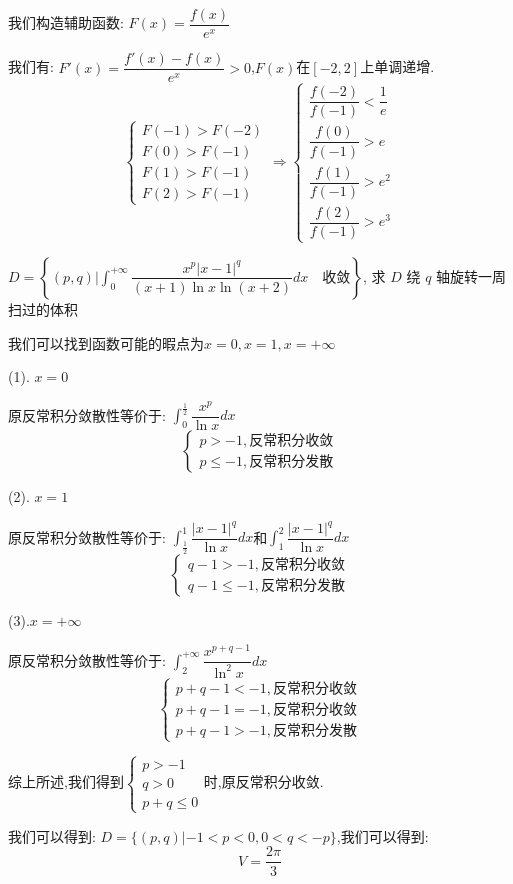 \begin{solution}

	我们构造辅助函数:  $F(x)=\dfrac{f(x)}{e^x}$
	
	我们有:  $F'(x)=\dfrac{f'(x)-f(x)}{e^x}>0$,$F(x)$在$[-2,2]$上单调递增.
	$$\left\lbrace
	\begin{array}{l}
		F(-1)>F(-2)\\
		F(0)>F(-1)\\
		F(1)>F(-1)\\
		F(2)>F(-1)
	\end{array}
	\right. \Rightarrow \left\lbrace
	\begin{array}{l}
		\dfrac{f(-2)}{f(-1)}<\dfrac{1}{e}\\
		\dfrac{f(0)}{f(-1)}>e\\
		\dfrac{f(1)}{f(-1)}>e^2\\
		\dfrac{f(2)}{f(-1)}>e^3
	\end{array}
	\right. $$
\end{solution}

\begin{example}[][Exam: 35.3.8]
	$D=\left\{(p,q)\big|\int_{0}^{+\infty}\dfrac{x^p|x-1|^q}{(x+1)\ln x\ln(x+2)}dx\quad \text{收敛}\right\}$, 求 $D$ 绕 $q$ 轴旋转一周扫过的体积
\end{example}
\begin{solution}

	我们可以找到函数可能的暇点为$x=0,x=1,x=+\infty$
	
	(1). $x=0$
	
	原反常积分敛散性等价于:  $\int_{0}^{\frac{1}{2}}\dfrac{x^p}{\ln x}dx$
	$$\left\lbrace
	\begin{array}{l}
		p>-1,\text{反常积分收敛}\\
		p\leq-1,\text{反常积分发散}
	\end{array}
	\right. $$
	
	(2). $x=1$
	
	原反常积分敛散性等价于:  $\int_{\frac{1}{2}}^{1}\dfrac{|x-1|^q}{\ln x}dx$和$\int_{1}^{2}\dfrac{|x-1|^q}{\ln x}dx$
	$$\left\lbrace
	\begin{array}{l}
		q-1>-1,\text{反常积分收敛}\\
		q-1\leq-1,\text{反常积分发散}
	\end{array}
	\right. $$
	
	(3).$x=+\infty$
	
	原反常积分敛散性等价于:  $\int_{2}^{+\infty}\dfrac{x^{p+q-1}}{\ln^2 x}dx$
	$$\left\lbrace
	\begin{array}{l}
		p+q-1<-1,\text{反常积分收敛}\\
		p+q-1=-1,\text{反常积分收敛}\\
		p+q-1>-1,\text{反常积分发散}
	\end{array}
	\right. $$
	
	综上所述,我们得到$\left\lbrace
	\begin{array}{l}
		p>-1\\
		q>0\\
		p+q\leq 0
	\end{array}
	\right. $时,原反常积分收敛.
	
	我们可以得到:  $D=\{(p,q)|-1<p<0,0<q<-p\}$,我们可以得到:  
	$$V=\dfrac{2\pi}{3}$$
\end{solution}


